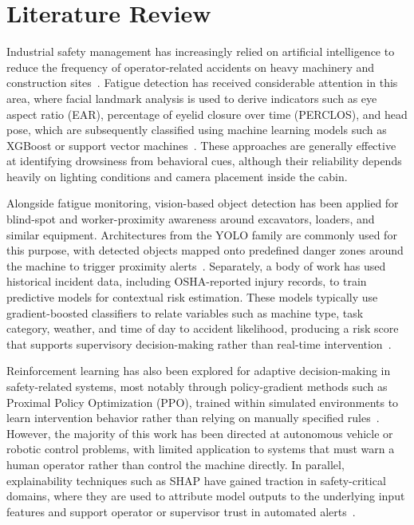 
\section{Literature Review}

Industrial safety management has increasingly relied on artificial intelligence to reduce the frequency of operator-related accidents on heavy machinery and construction sites~\cite{ref1}. Fatigue detection has received considerable attention in this area, where facial landmark analysis is used to derive indicators such as eye aspect ratio (EAR), percentage of eyelid closure over time (PERCLOS), and head pose, which are subsequently classified using machine learning models such as XGBoost or support vector machines~\cite{ref2}. These approaches are generally effective at identifying drowsiness from behavioral cues, although their reliability depends heavily on lighting conditions and camera placement inside the cabin.

Alongside fatigue monitoring, vision-based object detection has been applied for blind-spot and worker-proximity awareness around excavators, loaders, and similar equipment. Architectures from the YOLO family are commonly used for this purpose, with detected objects mapped onto predefined danger zones around the machine to trigger proximity alerts~\cite{ref3}. Separately, a body of work has used historical incident data, including OSHA-reported injury records, to train predictive models for contextual risk estimation. These models typically use gradient-boosted classifiers to relate variables such as machine type, task category, weather, and time of day to accident likelihood, producing a risk score that supports supervisory decision-making rather than real-time intervention~\cite{ref4}.

Reinforcement learning has also been explored for adaptive decision-making in safety-related systems, most notably through policy-gradient methods such as Proximal Policy Optimization (PPO), trained within simulated environments to learn intervention behavior rather than relying on manually specified rules~\cite{ref5}. However, the majority of this work has been directed at autonomous vehicle or robotic control problems, with limited application to systems that must warn a human operator rather than control the machine directly. In parallel, explainability techniques such as SHAP have gained traction in safety-critical domains, where they are used to attribute model outputs to the underlying input features and support operator or supervisor trust in automated alerts~\cite{ref6}.

